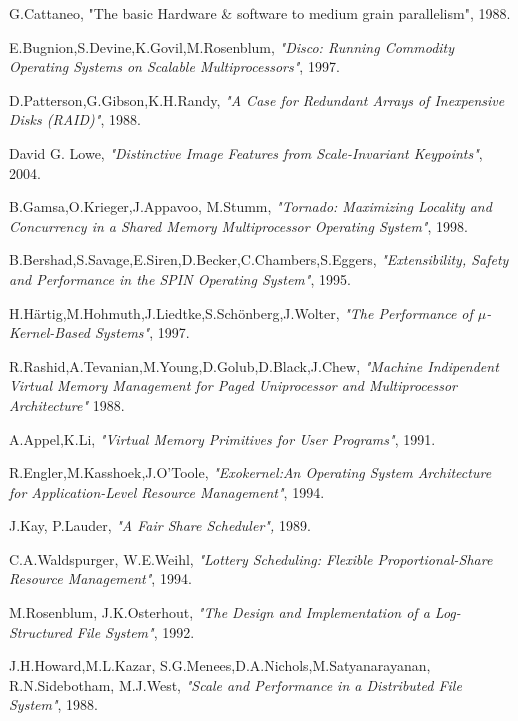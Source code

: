 {\RaggedRight
\begin{thebibliography}{21}
\addtolength{\leftmargin}{0.2in}
\setlength{\itemindent}{-0.2in}
\footnotesize
   G.Cattaneo, "The basic Hardware \& software to medium grain parallelism", 1988.
  
   E.Bugnion,S.Devine,K.Govil,M.Rosenblum, \textit{"Disco: Running Commodity Operating Systems on Scalable Multiprocessors"}, 1997.
  
   D.Patterson,G.Gibson,K.H.Randy, \textit{"A Case for Redundant Arrays of Inexpensive Disks (RAID)"}, 1988.
  
   David G. Lowe,\textit{ "Distinctive Image Features from Scale-Invariant Keypoints"}, 2004.
  
   B.Gamsa,O.Krieger,J.Appavoo, M.Stumm,\textit{ "Tornado: Maximizing Locality and Concurrency in a Shared Memory Multiprocessor Operating System"}, 1998.
  
   B.Bershad,S.Savage,E.Siren,D.Becker,C.Chambers,S.Eggers, \textit{"Extensibility, Safety and Performance in the SPIN Operating System"}, 1995.
  
  H.H\"{a}rtig,M.Hohmuth,J.Liedtke,S.Sch\"{o}nberg,J.Wolter, \textit{"The Performance of $\mu$-Kernel-Based Systems"}, 1997.
  
   R.Rashid,A.Tevanian,M.Young,D.Golub,D.Black,J.Chew,\textit{ "Machine Indipendent Virtual Memory Management for Paged Uniprocessor and Multiprocessor Architecture"} 1988.
  
   A.Appel,K.Li, \textit{"Virtual Memory Primitives for User Programs"}, 1991.
  
   R.Engler,M.Kasshoek,J.O'Toole, \textit{"Exokernel:An Operating System Architecture for Application-Level Resource Management"}, 1994.
  
	 J.Kay, P.Lauder, \textit{"A Fair Share Scheduler",} 1989.
	
	 C.A.Waldspurger, W.E.Weihl, \textit{"Lottery Scheduling: Flexible Proportional-Share Resource Management"}, 1994.
	
	 M.Rosenblum, J.K.Osterhout, \textit{"The Design and Implementation of a Log-Structured File System"}, 1992.
	
	 J.H.Howard,M.L.Kazar, S.G.Menees,D.A.Nichols,M.Satyanarayanan, R.N.Sidebotham, M.J.West, \textit{"Scale and Performance in a Distributed File System"}, 1988.
	

\end{thebibliography}}
